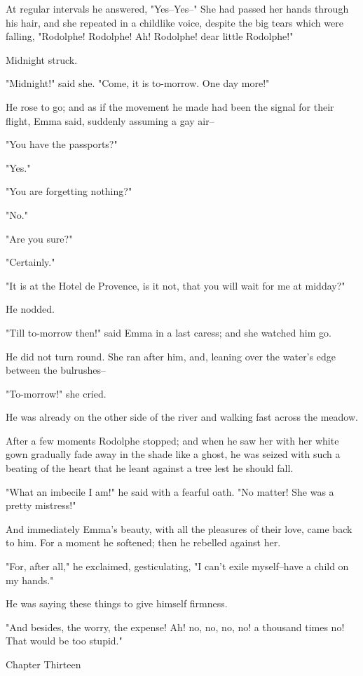 \documentclass[11pt,twocolumn]{ltugboat}
\begin{document}
At regular intervals he answered, "Yes--Yes--" She had passed her hands
through his hair, and she repeated in a childlike voice, despite the big
tears which were falling, "Rodolphe! Rodolphe! Ah! Rodolphe! dear little
Rodolphe!"

Midnight struck.

"Midnight!" said she. "Come, it is to-morrow. One day more!"

He rose to go; and as if the movement he made had been the signal for
their flight, Emma said, suddenly assuming a gay air--

"You have the passports?"

"Yes."

"You are forgetting nothing?"

"No."

"Are you sure?"

"Certainly."

"It is at the Hotel de Provence, is it not, that you will wait for me at
midday?"

He nodded.

"Till to-morrow then!" said Emma in a last caress; and she watched him
go.

He did not turn round. She ran after him, and, leaning over the water's
edge between the bulrushes--

"To-morrow!" she cried.

He was already on the other side of the river and walking fast across
the meadow.

After a few moments Rodolphe stopped; and when he saw her with her white
gown gradually fade away in the shade like a ghost, he was seized with
such a beating of the heart that he leant against a tree lest he should
fall.

"What an imbecile I am!" he said with a fearful oath. "No matter! She
was a pretty mistress!"

And immediately Emma's beauty, with all the pleasures of their love,
came back to him. For a moment he softened; then he rebelled against
her.

"For, after all," he exclaimed, gesticulating, "I can't exile
myself--have a child on my hands."

He was saying these things to give himself firmness.

"And besides, the worry, the expense! Ah! no, no, no, no! a thousand
times no! That would be too stupid."



Chapter Thirteen
\end{document}
